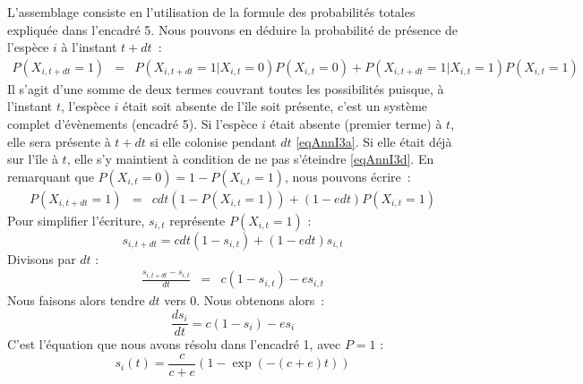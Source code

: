 L'assemblage consiste en l'utilisation de la formule des probabilités totales expliquée dans l'encadré 5. Nous pouvons en déduire la probabilité de présence de l'espèce $i$ à l'instant $t+dt$~:
\begin{eqnarray}
\label{eqAnnI4} P(X_{i,t+dt}=1)&=&P(X_{i,t+dt}=1|X_{i,t}=0)P(X_{i,t}=0)+P(X_{i,t+dt}=1|X_{i,t}=1)P(X_{i,t}=1)
\end{eqnarray}
Il s'agit d'une somme de deux termes couvrant toutes les possibilités puisque, à l'instant $t$, l'espèce $i$ était soit absente de l'île soit présente, c'est un système complet d'évènements (encadré 5). Si l'espèce $i$ était absente (premier terme) à $t$, elle sera présente à $t+dt$ si elle colonise pendant $dt$ \eqref{eqAnnI3a}. Si elle était déjà sur l'île à $t$, elle s'y maintient à condition de ne pas s'éteindre \eqref{eqAnnI3d}. En remarquant que $P(X_{i,t}=0)=1-P(X_{i,t}=1)$, nous pouvons écrire~:
\begin{eqnarray}
\label{eqAnnI5a} P(X_{i,t+dt}=1)&=&cdt(1-P(X_{i,t}=1))+(1-edt)P(X_{i,t}=1)
\end{eqnarray}
Pour simplifier l'écriture, $s_{i,t}$ représente $P(X_{i,t}=1)$ :
\begin{equation}
\label{eqAnnI5b} s_{i,t+dt}=cdt(1-s_{i,t})+(1-edt)s_{i,t}
\end{equation}
Divisons par $dt$ :
\begin{eqnarray}
\label{eqAnnI5c} \frac{s_{i,t+dt}-s_{i,t}}{dt}&=&c(1-s_{i,t})-es_{i,t}
\end{eqnarray}
Nous faisons alors tendre $dt$ vers 0. Nous obtenons alors~:
\begin{equation}
\label{eqAnnI5e} \frac{ds_{i}}{dt}=c(1-s_{i})-es_{i}
\end{equation}
C'est l'équation que nous avons résolu dans l'encadré 1, avec $P=1$  :
\begin{equation}
\label{eqAnnI5e} s_{i}(t)=\frac{c}{c+e} \left(1-\exp{(-(c+e)t)}\right)
\end{equation}

